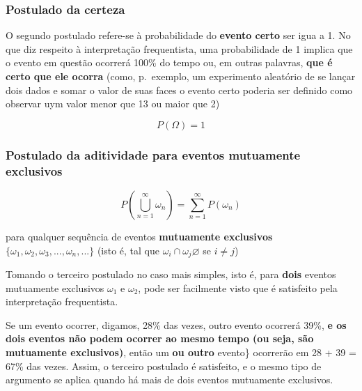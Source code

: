 \documentclass[
]{book}
\begin{document}
\hfill\break

\hypertarget{postulado-da-certeza}{%
\subsubsection{Postulado da certeza}\label{postulado-da-certeza}}

O segundo postulado refere-se à probabilidade do \textbf{evento certo} ser igua a 1. No que diz respeito à interpretação frequentista, uma probabilidade de 1 implica que o evento em questão ocorrerá 100\% do tempo ou, em outras palavras, \textbf{que é certo que ele ocorra} (como, p.~exemplo, um experimento aleatório de se lançar dois dados e somar o valor de suas faces o evento certo poderia ser definido como observar uym valor menor que 13 ou maior que 2)

\hfill\break

\[
P(\Omega) = 1
\]

\hfill\break

\hypertarget{postulado-da-aditividade-para-eventos-mutuamente-exclusivos}{%
\subsubsection{Postulado da aditividade para eventos mutuamente exclusivos}\label{postulado-da-aditividade-para-eventos-mutuamente-exclusivos}}

\[
P\left(\bigcup _{n=1}^{\infty }{\omega}_{n}\right)=\sum _{n=1}^{\infty }P\left({\omega}_{n}\right)
\]

\hfill\break

para qualquer sequência de eventos \textbf{mutuamente exclusivos} \(\{\omega_{1}, \omega_{2}, \omega_{3}, ..., \omega_{n}, ...\}\) (isto é, tal que \(\omega_{i} \cap \omega_{j} \varnothing\) se \(i \neq j\))

\hfill\break

Tomando o terceiro postulado no caso mais simples, isto é, para \textbf{dois} eventos mutuamente exclusivos \(\omega_{1}\) e \(\omega_{2}\), pode ser facilmente visto que é satisfeito pela interpretação frequentista.

\hfill\break

Se um evento ocorrer, digamos, 28\% das vezes, outro evento ocorrerá 39\%, \textbf{e os dois eventos não podem ocorrer ao mesmo tempo (ou seja, são mutuamente exclusivos)}, então um \textbf{ou outro} evento\} ocorrerão em 28 + 39 = 67\% das vezes. Assim, o terceiro postulado é satisfeito, e o mesmo tipo de argumento se aplica quando há mais de dois eventos mutuamente exclusivos.
\end{document}
